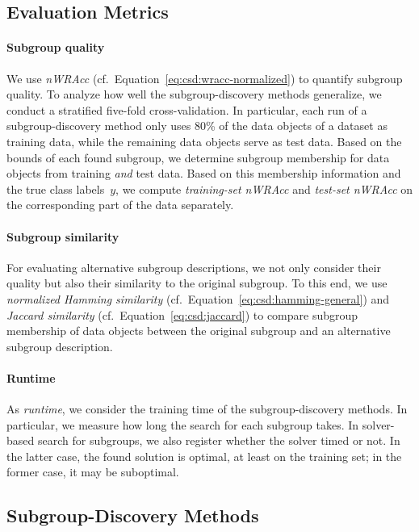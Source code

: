 \documentclass{article}
\theoremstyle{definition}
\begin{document}
\subsection{Evaluation Metrics}
\label{sec:csd:experimental-design:metrics}

\paragraph{Subgroup quality}

We use \emph{nWRAcc} (cf.~Equation~\ref{eq:csd:wracc-normalized}) to quantify subgroup quality.
To analyze how well the subgroup-discovery methods generalize, we conduct a stratified five-fold cross-validation.
In particular, each run of a subgroup-discovery method only uses 80\% of the data objects of a dataset as training data, while the remaining data objects serve as test data.
Based on the bounds of each found subgroup, we determine subgroup membership for data objects from training \emph{and} test data.
Based on this membership information and the true class labels~$y$, we compute \emph{training-set nWRAcc} and \emph{test-set nWRAcc} on the corresponding part of the data separately.

\paragraph{Subgroup similarity}

For evaluating alternative subgroup descriptions, we not only consider their quality but also their similarity to the original subgroup.
To this end, we use \emph{normalized Hamming similarity} (cf.~Equation~\ref{eq:csd:hamming-general}) and \emph{Jaccard similarity} (cf.~Equation~\ref{eq:csd:jaccard}) to compare subgroup membership of data objects between the original subgroup and an alternative subgroup description.

\paragraph{Runtime}

As \emph{runtime}, we consider the training time of the subgroup-discovery methods.
In particular, we measure how long the search for each subgroup takes.
In solver-based search for subgroups, we also register whether the solver timed or not.
In the latter case, the found solution is optimal, at least on the training set; in the former case, it may be suboptimal.

\subsection{Subgroup-Discovery Methods}
\label{sec:csd:experimental-design:methods}
\end{document}

